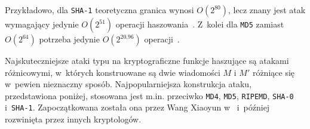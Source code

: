 Przykładowo, dla \texttt{SHA-1} teoretyczna granica wynosi $O(2^{80})$, lecz
znany jest atak wymagający jedynie $O(2^{51})$ operacji
haszowania~\cite{best_sha1_collision_attack}. Z~kolei dla \texttt{MD5} zamiast
$O(2^{64})$ potrzeba jedynie $O(2^{20.96})$
operacji~\cite{best_md5_collision_attack}.

Najskuteczniejsze ataki typu  na kryptograficzne funkcje
haszujące są atakami różnicowymi, w~których konstruowane są dwie wiadomości $M$
i $M'$ różniące się w~pewien nieznaczny sposób. Najpopularniejsza konstrukcja
ataku, przedstawiona poniżej, stosowana jest m.in. przeciwko \texttt{MD4},
\texttt{MD5}, \texttt{RIPEMD}, \texttt{SHA-0} i~\texttt{SHA-1}. Zapoczątkowana
została ona przez Wang Xiaoyun
w~\cite{wang_collision_attack1,wang_collision_attack2,wang_collision_attack3}
i~później rozwinięta przez innych kryptologów.

